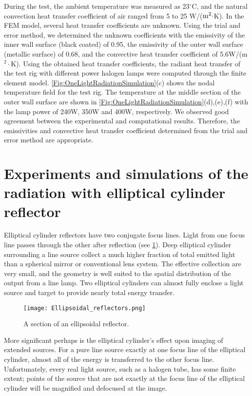 During the test, the ambient temperature was measured as 23$^{\circ}$C, and the natural convection heat transfer coefficient of air ranged from 5 to 25 W/(${\rm{m}}^2\cdot$K).
In the FEM model, several heat transfer coefficients are unknown.
Using the trial and error method, we determined the unknown coefficients with the emissivity of the inner wall surface (black coated) of 0.95, the emissivity of the outer wall surface (metallic surface) of 0.68, and the convective heat transfer coefficient of 5.6W/(m$^2\cdot$K).
Using the obtained heat transfer coefficients, the radiant heat transfer of the test rig with different power halogen lamps were computed through the finite element model. 
\ref{Fig:OneLightRadiationSimulation}(c) shows the nodal temperature field for the test rig. 
The temperature at the middle section of the outer wall surface are shown in \ref{Fig:OneLightRadiationSimulation}(d),(e),(f) with the lamp power of 240W, 350W and 400W, respectively.
We observed good agreement between the experimental and computational results.
Therefore, the emissivities and convective heat transfer coefficient determined from the trial and error method are appropriate.




\section{Experiments and simulations of the radiation with elliptical cylinder reflector}
\noindent
Elliptical cylinder reflectors have two conjugate focus lines. Light from one focus line passes through the other after reflection (see \ref{Fig:EllipsoidalReflectors}).
Deep elliptical cylinder surrounding a line source collect a much higher fraction of total emitted light than a spherical mirror or conventional lens system.
The effective collection are very small, and the geometry is well suited to the spatial distribution of the output from a line lamp.
Two elliptical cylinders can almost fully enclose a light source and target to provide nearly total energy transfer.
\begin{figure}[!htp]
	\centering
	\texttt{[image: Ellipsoidal\_reflectors.png]}
	\caption{A section of an ellipsoidal reflector. }
	\label{Fig:EllipsoidalReflectors}
\end{figure}
More significant perhaps is the elliptical cylinder's effect upon imaging of extended sources.
For a pure line source exactly at one focus line of the elliptical cylinder, almost all of the energy is transferred to the other focus line.
Unfortunately, every real light source, such as a halogen tube, has some finite extent; points of the source that are not exactly at the focus line of the elliptical cylinder will be magnified and defocused at the image.

